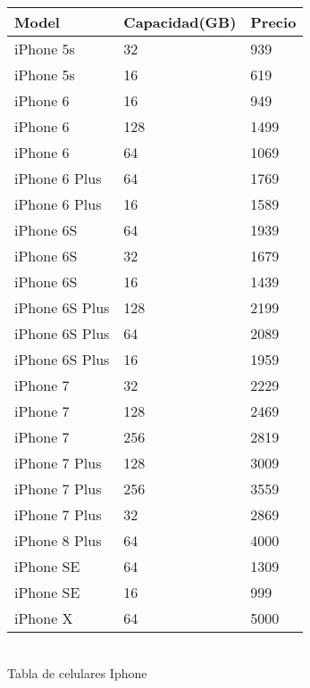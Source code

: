 \documentclass[a4paper ,12pt]{article}
\begin{document}
\begin{center}
	{\large 	
		\begin{tabular}{lll}
			\hline
			Model&Capacidad(GB)&Precio \\
			\hline

			iPhone 5s&32&939 \\
			iPhone 5s&16&619 \\
			iPhone 6&16&949 \\
			iPhone 6&128&1499 \\
			iPhone 6&64&1069 \\
			iPhone 6 Plus&64&1769 \\
			iPhone 6 Plus&16&1589 \\
			iPhone 6S&64&1939\\
			iPhone 6S&32&1679\\
			iPhone 6S&16&1439\\
			iPhone 6S Plus&128&2199 \\
			iPhone 6S Plus&64&2089 \\
			iPhone 6S Plus&16&1959 \\
			iPhone 7&32&2229\\
			iPhone 7&128&2469\\
			iPhone 7&256&2819\\
			iPhone 7 Plus&128&3009 \\
			iPhone 7 Plus&256&3559 \\
			iPhone 7 Plus&32&2869 \\
			iPhone 8 Plus&64&4000 \\
			iPhone SE&64&1309 \\
			iPhone SE&16&999 \\
			iPhone X&64&5000 \\
			
		\hline
		\end{tabular}
	}\\
	
	Tabla de celulares Iphone
\end{center}
\end{document}
